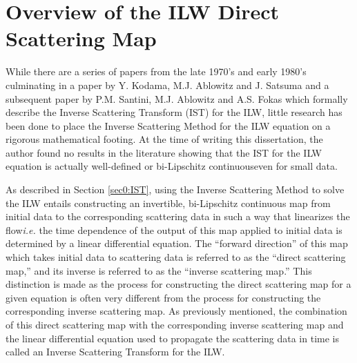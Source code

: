 \documentclass[../dissertation.tex]{subfiles}
\begin{document}
\section{Overview of the ILW Direct Scattering Map}\label{sec0:DM}

While there are a series of papers from the late 1970's and early 1980's 
culminating in a paper by Y. Kodama, M.J. Ablowitz and J. Satsuma 
\cite{Kodama1982} and a subsequent paper by P.M. Santini, M.J. Ablowitz and A.S. 
Fokas \cite{Santini1984} which formally describe the Inverse Scattering 
Transform (IST) for the ILW, little research has been done to place the Inverse 
Scattering Method for the ILW equation on a rigorous mathematical footing. 
At the time of writing this dissertation, the author found no results in the 
literature showing that the IST for the ILW equation is actually well-defined
or bi-Lipschitz continuous\textemdash{}even for small data.

As described in Section \ref{sec0:IST}, using the Inverse
Scattering Method to solve the ILW entails constructing 
an invertible, bi-Lipschitz
continuous map from initial data to the corresponding scattering data in such 
a way that linearizes the flow\textemdash{}\textit{i.e.} the time dependence 
of the output of this map applied to initial data is determined by a linear 
differential equation. The ``forward
direction'' of this map which takes initial data to scattering data is referred to 
as the ``direct scattering map,'' and its inverse
is referred to as the ``inverse scattering map.'' This distinction is made as the process for 
constructing the direct scattering map for a given equation is often very different from
the process for constructing the corresponding inverse scattering map. As previously mentioned,
the combination of this direct scattering map with the corresponding inverse 
scattering map and the linear differential equation used to propagate the scattering data in 
time is called an Inverse Scattering Transform for the ILW.
\end{document}
